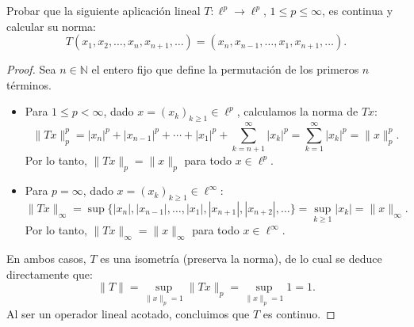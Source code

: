 \documentclass{article}
\theoremstyle{definition}
\newcommand{\N}{\mathbb{N}}
\newenvironment{ejercicio}[1]{\begin{trivlist}
\item[\hskip \labelsep {\bfseries Ejercicio}\hskip \labelsep {\bfseries #1.}]}{\end{trivlist}}
\begin{document}
\begin{ejercicio}{5}
    Probar que la siguiente aplicación lineal \(T:\ell^p\to\ell^p\), \( 1\leq p\leq\infty \), es continua y calcular su norma:
    \[
        T(x_1,x_2,\dots,x_n,x_{n+1},\dots)=(x_n,x_{n-1},\dots,x_1,x_{n+1},\dots).
    \]
\end{ejercicio}
\begin{proof}
    Sea \( n \in \N \) el entero fijo que define la permutación de los primeros \(n\) términos.

    \begin{itemize}
        \item Para \( 1 \le p < \infty \), dado \(x = (x_k)_{k \geq 1} \in \ell^p\), calculamos la norma de \(Tx\):
              \[
                  \|Tx\|_p^p = |x_n|^p + |x_{n-1}|^p + \cdots + |x_1|^p + \sum_{k=n+1}^\infty |x_k|^p = \sum_{k=1}^\infty |x_k|^p = \|x\|_p^p.
              \]
              Por lo tanto, \( \|Tx\|_p = \|x\|_p \) para todo \(x \in \ell^p\).

        \item Para \( p = \infty \), dado \( x = {(x_k)}_{k \geq 1} \in \ell^\infty \):
              \[
                  \|Tx\|_\infty = \sup \{ |x_n|, |x_{n-1}|, \dots, |x_1|, |x_{n+1}|, |x_{n+2}|, \dots \} = \sup_{k \geq 1} |x_k| = \|x\|_\infty.
              \]
              Por lo tanto, \( \|Tx\|_\infty = \|x\|_\infty \) para todo \( x \in \ell^\infty \).
    \end{itemize}

    En ambos casos, \(T\) es una isometría (preserva la norma), de lo cual se deduce directamente que:
    \[
        \|T\| = \sup_{\|x\|_p = 1} \|Tx\|_p = \sup_{\|x\|_p = 1} 1 = 1.
    \]
    Al ser un operador lineal acotado, concluimos que \(T\) es continuo.
\end{proof}

\vspace{0.5cm}
\end{document}
